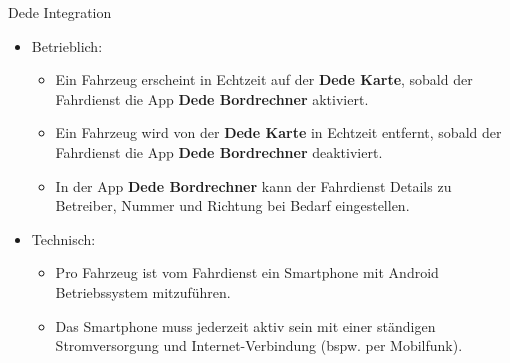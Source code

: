 
\begin{frame}{Dede Integration}
  \begin{itemize}
  \item Betrieblich:
    \begin{itemize}
    \item Ein Fahrzeug erscheint in Echtzeit auf der \textbf{Dede Karte}, sobald der Fahrdienst die App \textbf{Dede Bordrechner} aktiviert.
    \item Ein Fahrzeug wird von der \textbf{Dede Karte} in Echtzeit entfernt, sobald der Fahrdienst die App \textbf{Dede Bordrechner} deaktiviert.
      \item In der App \textbf{Dede Bordrechner} kann der Fahrdienst Details zu Betreiber, Nummer und Richtung bei Bedarf eingestellen.
    \end{itemize}
  \item Technisch:
    \begin{itemize}
    \item Pro Fahrzeug ist vom Fahrdienst ein Smartphone mit Android Betriebssystem mitzuführen.
    \item Das Smartphone muss jederzeit aktiv sein mit einer ständigen Stromversorgung und Internet-Verbindung (bspw. per Mobilfunk).
    \end{itemize}
  \end{itemize}
\end{frame}
